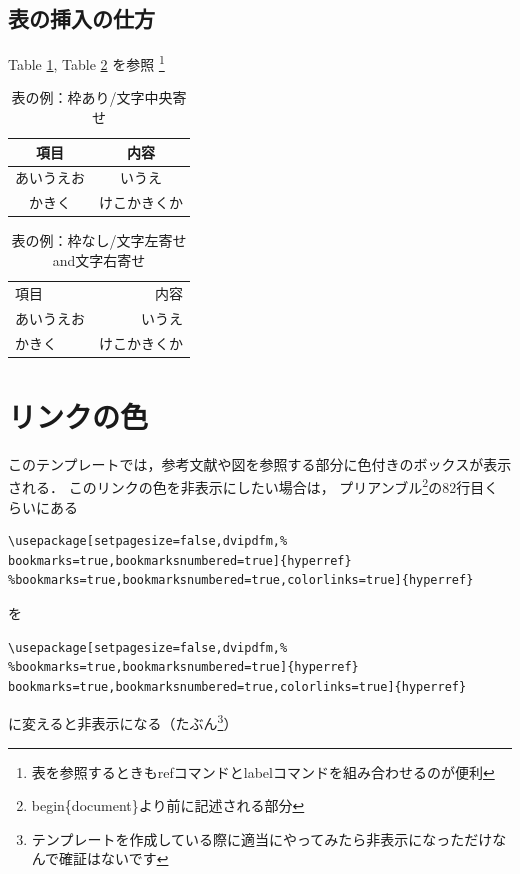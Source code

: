 \documentclass[12pt]{sonota/aislab}
\begin{document}
\clearpage %

\subsection{表の挿入の仕方}
Table \ref{table:sample01}, Table \ref{table:sample02} を参照
\footnote{表を参照するときもrefコマンドとlabelコマンドを組み合わせるのが便利}
\begin{table}
	\caption{表の例：枠あり/文字中央寄せ}
	\label{table:sample01}
	\centering %
	\begin{tabular}[tbp]{|c|c|} %
		\hline %
		項目 & 内容 \\\hline
		あいうえお & いうえ \\
		かきく & けこかきくか \\\hline
	\end{tabular}
\end{table}

\begin{table}
	\caption{表の例：枠なし/文字左寄せand文字右寄せ}
	\label{table:sample02}
	\centering %
	\begin{tabular}[tbp]{l r} %
		項目 & 内容 \\
		あいうえお & いうえ \\
		かきく & けこかきくか \\
	\end{tabular}
\end{table}

\section{リンクの色}
このテンプレートでは，参考文献や図を参照する部分に色付きのボックスが表示される．
このリンクの色を非表示にしたい場合は，
プリアンブル\footnote{begin\{document\}より前に記述される部分}の82行目くらいにある

\noindent
\hrulefill
\vspace{-1em}
\begin{verbatim}
\usepackage[setpagesize=false,dvipdfm,%
bookmarks=true,bookmarksnumbered=true]{hyperref}
%bookmarks=true,bookmarksnumbered=true,colorlinks=true]{hyperref}
\end{verbatim}
\vspace{-1em}
\hrulefill

\noindent %
を

\noindent
\dotfill
\vspace{-1em}
\begin{verbatim}
\usepackage[setpagesize=false,dvipdfm,%
%bookmarks=true,bookmarksnumbered=true]{hyperref}
bookmarks=true,bookmarksnumbered=true,colorlinks=true]{hyperref}
\end{verbatim}
\vspace{-1em}
\dotfill

\noindent %
に変えると非表示になる（たぶん\footnote{テンプレートを作成している際に適当にやってみたら非表示になっただけなんで確証はないです}）

\end{document}
